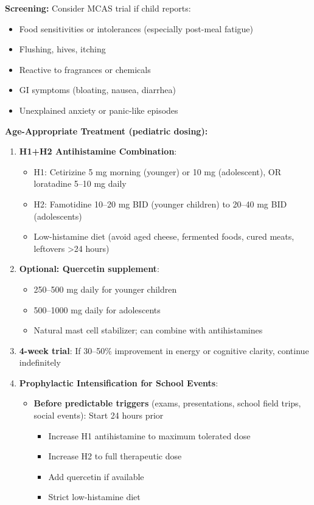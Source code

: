 \begin{recommendation}
\label{rec:mcas-ped-ambulatory}

\textbf{Screening:} Consider MCAS trial if child reports:
\begin{itemize}
    \item Food sensitivities or intolerances (especially post-meal fatigue)
    \item Flushing, hives, itching
    \item Reactive to fragrances or chemicals
    \item GI symptoms (bloating, nausea, diarrhea)
    \item Unexplained anxiety or panic-like episodes
\end{itemize}

\textbf{Age-Appropriate Treatment (pediatric dosing):}

\begin{enumerate}
    \item \textbf{H1+H2 Antihistamine Combination}:
    \begin{itemize}
        \item H1: Cetirizine 5 mg morning (younger) or 10 mg (adolescent), OR loratadine 5--10 mg daily
        \item H2: Famotidine 10--20 mg BID (younger children) to 20--40 mg BID (adolescents)
        \item Low-histamine diet (avoid aged cheese, fermented foods, cured meats, leftovers >24 hours)
    \end{itemize}

    \item \textbf{Optional: Quercetin supplement}:
    \begin{itemize}
        \item 250--500 mg daily for younger children
        \item 500--1000 mg daily for adolescents
        \item Natural mast cell stabilizer; can combine with antihistamines
    \end{itemize}

    \item \textbf{4-week trial}: If 30--50\% improvement in energy or cognitive clarity, continue indefinitely

    \item \textbf{Prophylactic Intensification for School Events}:
    \begin{itemize}
        \item \textbf{Before predictable triggers} (exams, presentations, school field trips, social events): Start 24 hours prior
        \begin{itemize}
            \item Increase H1 antihistamine to maximum tolerated dose
            \item Increase H2 to full therapeutic dose
            \item Add quercetin if available
            \item Strict low-histamine diet
        \end{itemize}


\end{itemize}
\end{enumerate}
\end{recommendation}
